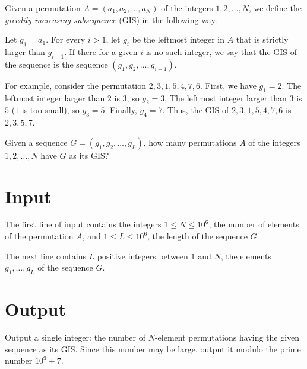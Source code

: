 Given a permutation $A = (a_1, a_2, \dots, a_N)$ of the integers $1, 2, \dots, N$, we define the \emph{greedily increasing subsequence} (GIS) in the following way.

Let $g_1 = a_1$. For every $i > 1$, let $g_i$ be the leftmost integer in $A$ that is strictly larger than $g_{i-1}$.
If there for a given $i$ is no such integer, we say that the GIS of the sequence is the sequence $(g_1, g_2, ..., g_{i - 1})$.

For example, consider the permutation $2, 3, 1, 5, 4, 7, 6$.
First, we have $g_1 = 2$.
The leftmost integer larger than $2$ is $3$, so $g_2 = 3$.
The leftmost integer larger than $3$ is $5$ ($1$ is too small), so $g_3 = 5$.
Finally, $g_4 = 7$.
Thus, the GIS of $2, 3, 1, 5, 4, 7, 6$ is $2, 3, 5, 7$.

Given a sequence $G = (g_1, g_2, \dots, g_L)$, how many permutations $A$ of the integers $1, 2, \dots, N$ have $G$ as its GIS?

\section*{Input}
The first line of input contains the integers $1 \le N \le 10^6$, the number of elements of the permutation $A$,
and $1 \le L \le 10^6$, the length of the sequence $G$.

The next line contains $L$ positive integers between $1$ and $N$, the elements $g_1, \dots, g_L$ of the sequence $G$.

\section*{Output}
Output a single integer: the number of $N$-element permutations having the given sequence as its GIS.
Since this number may be large, output it modulo the prime number $10^9 + 7$.
